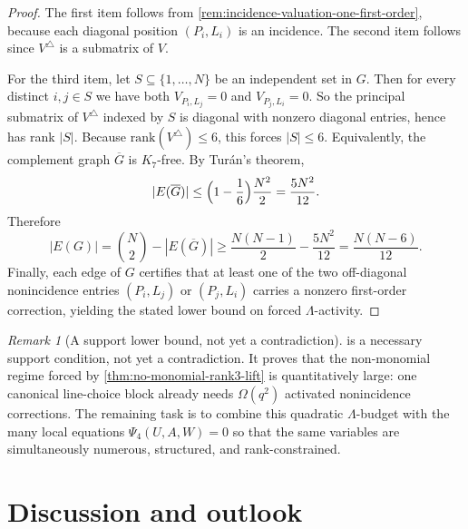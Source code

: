 \documentclass[11pt]{amsart}
\numberwithin{equation}{section}
\theoremstyle{plain}
\theoremstyle{definition}
\theoremstyle{remark}
\newtheorem{remark}[theorem]{Remark}
\newcommand{\rank}{\mathrm{rank}}
\newcommand{\Lam}{\Lambda}
\begin{document}
\begin{proof}
The first item follows from \cref{rem:incidence-valuation-one-first-order}, because each diagonal position $(P_i,L_i)$ is an incidence.
The second item follows since $V^{\triangle}$ is a submatrix of $V$.

For the third item, let $S\subseteq\{1,\dots,N\}$ be an independent set in $G$.
Then for every distinct $i,j\in S$ we have both $V_{P_i,L_j}=0$ and $V_{P_j,L_i}=0$.
So the principal submatrix of $V^{\triangle}$ indexed by $S$ is diagonal with nonzero diagonal entries, hence has rank $|S|$.
Because $\rank(V^{\triangle})\le 6$, this forces $|S|\le 6$.
Equivalently, the complement graph $\overline G$ is $K_7$-free.
By Tur\'an's theorem,
\[
|E(\overline G)|\le \Bigl(1-\frac16\Bigr)\frac{N^2}{2}=\frac{5N^2}{12}.
\]
Therefore
\[
|E(G)|=\binom{N}{2}-|E(\overline G)|
\ge \frac{N(N-1)}{2}-\frac{5N^2}{12}
=\frac{N(N-6)}{12}.
\]
Finally, each edge of $G$ certifies that at least one of the two off-diagonal nonincidence entries $(P_i,L_j)$ or $(P_j,L_i)$ carries a nonzero first-order correction, yielding the stated lower bound on forced $\Lam$-activity.
\end{proof}

\begin{remark}[A support lower bound, not yet a contradiction]
\label{rem:note40-support-vs-solvability}
 is a necessary support condition, not yet a contradiction.
It proves that the non-monomial regime forced by \cref{thm:no-monomial-rank3-lift} is quantitatively large: one canonical line-choice block already needs $\Omega(q^2)$ activated nonincidence corrections.
The remaining task is to combine this quadratic $\Lam$-budget with the many local equations $\Psi_4(U,A,W)=0$ so that the same variables are simultaneously numerous, structured, and rank-constrained.
\end{remark}





\section{Discussion and outlook}
\label{sec:discussion}

\end{document}
